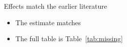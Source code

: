 \documentclass[11pt,aspectratio=169]{beamer}
\begin{document}
\begin{frame}{Effects match the earlier literature}
  \begin{itemize}
    \item The estimate matches \cite{missingFixtureKey}
    \item The full table is Table~\ref{tab:missing}
  \end{itemize}
\end{frame}
\end{document}
